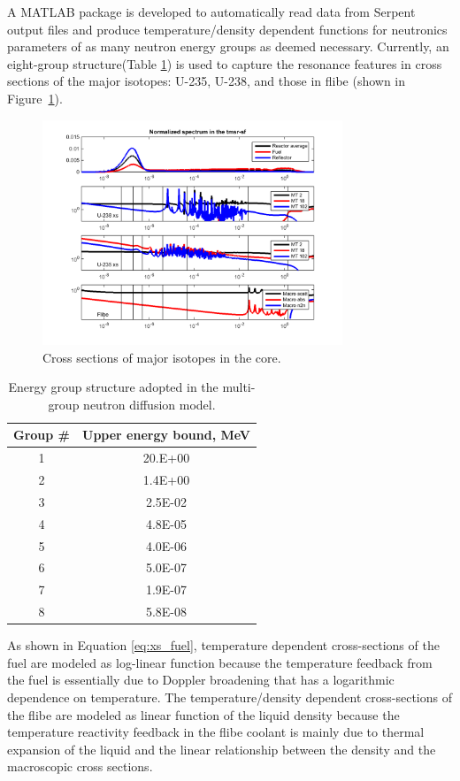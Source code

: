 \documentclass{elsarticle}
\begin{document}
A MATLAB package is developed to automatically read data from Serpent output files and produce temperature/density dependent functions for neutronics parameters of as many neutron energy groups as deemed necessary. Currently, an eight-group structure(Table \ref{tab:egroup}) is used to capture the resonance features in cross sections of the major isotopes: U-235, U-238, and those in flibe (shown in Figure~\ref{fig:xs_isotope}).
\begin{figure}[h]
  \centering
  \includegraphics[width=0.8\textwidth]{./images/diffusion/isotope_XS.png}
  \caption{Cross sections of major isotopes in the core.}
  \label{fig:xs_isotope}
\end{figure}

\begin{table}
\caption{Energy group structure adopted in the multi-group neutron diffusion model.}
  \centering
  \begin{tabular}{cc}
  Group \# & Upper energy bound, MeV\\
  \hline
  1 & 20.E+00\\
  2 & 1.4E+00\\
  3 & 2.5E-02\\
  4 & 4.8E-05\\
  5 & 4.0E-06\\
  6 & 5.0E-07\\
  7 & 1.9E-07\\
  8 & 5.8E-08\\
  \hline
  \end{tabular}
  \label{tab:egroup}
\end{table}

As shown in Equation \ref{eq:xs_fuel}, temperature dependent cross-sections of the fuel are modeled as log-linear function because the temperature feedback from the fuel is essentially due to Doppler broadening that has a logarithmic dependence on temperature. The temperature/density dependent cross-sections of the flibe are modeled as linear function of the liquid density because the temperature reactivity feedback in the flibe coolant is mainly due to thermal expansion of the liquid and the linear relationship between the density and the macroscopic cross sections.
\end{document}
